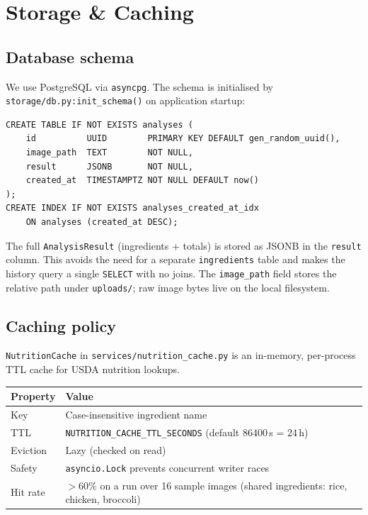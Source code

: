 \documentclass[11pt,a4paper]{article}
\begin{document}
\section{Storage \& Caching}\label{sec:storage}

\subsection{Database schema}

We use PostgreSQL via \texttt{asyncpg}.
The schema is initialised by \texttt{storage/db.py:init\_schema()} on application startup:

\begin{lstlisting}[style=sql]
CREATE TABLE IF NOT EXISTS analyses (
    id          UUID        PRIMARY KEY DEFAULT gen_random_uuid(),
    image_path  TEXT        NOT NULL,
    result      JSONB       NOT NULL,
    created_at  TIMESTAMPTZ NOT NULL DEFAULT now()
);
CREATE INDEX IF NOT EXISTS analyses_created_at_idx
    ON analyses (created_at DESC);
\end{lstlisting}

The full \texttt{AnalysisResult} (ingredients + totals) is stored as JSONB in the \texttt{result} column.
This avoids the need for a separate \texttt{ingredients} table and makes the history query a single \texttt{SELECT} with no joins.
The \texttt{image\_path} field stores the relative path under \texttt{uploads/}; raw image bytes live on the local filesystem.

\subsection{Caching policy}

\texttt{NutritionCache} in \texttt{services/nutrition\_cache.py} is an in-memory, per-process TTL cache for USDA nutrition lookups.

\begin{center}\small
\begin{tabular}{ll}
\toprule
\textbf{Property} & \textbf{Value} \\
\midrule
Key        & Case-insensitive ingredient name \\
TTL        & \texttt{NUTRITION\_CACHE\_TTL\_SECONDS} (default 86400\,s = 24\,h) \\
Eviction   & Lazy (checked on read) \\
Safety     & \texttt{asyncio.Lock} prevents concurrent writer races \\
Hit rate   & $> 60\%$ on a run over 16 sample images (shared ingredients: rice, chicken, broccoli) \\
\bottomrule
\end{tabular}
\end{center}
\end{document}
